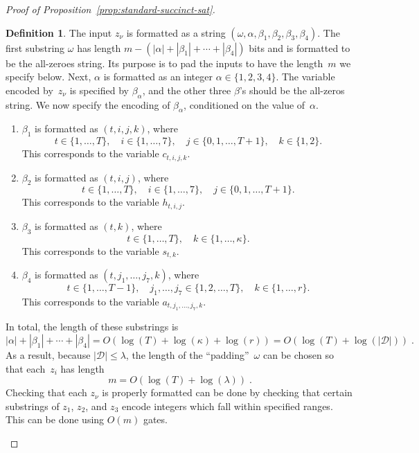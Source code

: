 \documentclass[11pt]{article}
\theoremstyle{definition}
\newtheorem{definition}[theorem]{Definition}
\newcommand{\decider}{\mathcal{D}}
\begin{document}
\begin{proof}[Proof of Proposition~\ref{prop:standard-succinct-sat}]
\begin{definition}
  The input $z_\nu$ is formatted as a string $(\omega, \alpha, \beta_1, \beta_2,
  \beta_3, \beta_4)$.
	The first substring $\omega$ has length $m - (|\alpha| + |\beta_1| + \cdots +
  |\beta_4|)$ bits and is formatted to be the all-zeroes string.
	Its purpose is to pad the inputs to have the length~$m$ we specify below.
	Next, $\alpha$ is formatted as an integer $\alpha \in \{1,2, 3, 4\}$.
	The variable encoded by~$z_\nu$ is specified by $\beta_\alpha$, and the other
  three $\beta$'s should be the all-zeros string.
	We now specify the encoding of $\beta_\alpha$, conditioned on the value
  of~$\alpha$.
	\begin{enumerate}
	\item $\beta_1$ is formatted as $(t, i, j, k)$, where\label{item:a=1}
		\begin{equation*}
      t \in \{1, \ldots, T\}, \quad i \in \{1, \ldots, 7\},
      \quad j \in \{0, 1, \ldots, T+1\}, \quad k \in \{1, 2\}.
		\end{equation*}
		This corresponds to the variable $c_{t, i, j, k}$.
	\item $\beta_2$ is formatted as $(t, i, j)$, where\label{item:a=2}
		\begin{equation*}
      t \in \{1, \ldots, T\}, \quad i \in \{1, \ldots, 7\},
      \quad j \in \{0, 1, \ldots, T+1\}.
		\end{equation*}
		This corresponds to the variable $h_{t, i, j}$.
	\item $\beta_3$ is formatted as $(t, k)$, where\label{item:a=3}
		\begin{equation*}
      t \in \{1, \ldots, T\}, \quad k \in \{1, \ldots, \kappa\}.
		\end{equation*}
		This corresponds to the variable $s_{t, k}$.
	\item $\beta_4$ is formatted as $(t, j_1, \ldots, j_7, k)$, where\label{item:a=4}
		\begin{equation*}
      t \in \{1, \ldots, T-1\}, \quad j_1, \ldots, j_7 \in \{1, 2, \ldots, T\},
      \quad k \in \{1, \ldots, r\}.
		\end{equation*}
		This corresponds to the variable $a_{t, j_1, \ldots, j_7, k}$.
	\end{enumerate}
	In total, the length of these substrings is
	\begin{equation*}
    |\alpha| + |\beta_1| + \cdots + |\beta_4| = O(\log(T) + \log(\kappa) +
    \log(r)) = O(\log(T) + \log(|\decider|))\;.
	\end{equation*}
	As a result, because $|\decider| \leq \lambda$, the length of the
  ``padding''~$\omega$ can be chosen so that each~$z_i$ has length
	\begin{equation}\label{eq:length-of-m}
    m = O(\log(T) + \log(\lambda))\;.
	\end{equation}
	Checking that each $z_\nu$ is properly formatted can be done by checking that
  certain substrings of $z_1$, $z_2$, and $z_3$ encode integers which fall
  within specified ranges.
	This can be done using $O(m)$ gates.


\end{definition}
\end{proof}
\end{document}
